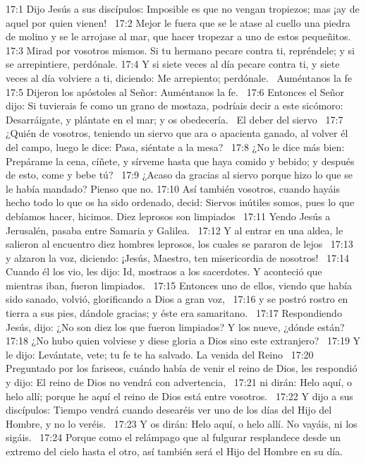 17:1 Dijo Jesús a sus discípulos: Imposible es que no vengan tropiezos; mas ¡ay de aquel por quien vienen!  
17:2 Mejor le fuera que se le atase al cuello una piedra de molino y se le arrojase al mar, que hacer tropezar a uno de estos pequeñitos.  
17:3 Mirad por vosotros mismos. Si tu hermano pecare contra ti, repréndele; y si se arrepintiere, perdónale. 
17:4 Y si siete veces al día pecare contra ti, y siete veces al día volviere a ti, diciendo: Me arrepiento; perdónale.  
Auméntanos la fe  
17:5 Dijeron los apóstoles al Señor: Auméntanos la fe.  
17:6 Entonces el Señor dijo: Si tuvierais fe como un grano de mostaza, podríais decir a este sicómoro: Desarráigate, y plántate en el mar; y os obedecería.  
El deber del siervo  
17:7 ¿Quién de vosotros, teniendo un siervo que ara o apacienta ganado, al volver él del campo, luego le dice: Pasa, siéntate a la mesa?  
17:8 ¿No le dice más bien: Prepárame la cena, cíñete, y sírveme hasta que haya comido y bebido; y después de esto, come y bebe tú?  
17:9 ¿Acaso da gracias al siervo porque hizo lo que se le había mandado? Pienso que no. 
17:10 Así también vosotros, cuando hayáis hecho todo lo que os ha sido ordenado, decid: Siervos inútiles somos, pues lo que debíamos hacer, hicimos. 
Diez leprosos son limpiados  
17:11 Yendo Jesús a Jerusalén, pasaba entre Samaria y Galilea.  
17:12 Y al entrar en una aldea, le salieron al encuentro diez hombres leprosos, los cuales se pararon de lejos  
17:13 y alzaron la voz, diciendo: ¡Jesús, Maestro, ten misericordia de nosotros!  
17:14 Cuando él los vio, les dijo: Id, mostraos a los sacerdotes. Y aconteció que mientras iban, fueron limpiados.  
17:15 Entonces uno de ellos, viendo que había sido sanado, volvió, glorificando a Dios a gran voz,  
17:16 y se postró rostro en tierra a sus pies, dándole gracias; y éste era samaritano.  
17:17 Respondiendo Jesús, dijo: ¿No son diez los que fueron limpiados? Y los nueve, ¿dónde están?  
17:18 ¿No hubo quien volviese y diese gloria a Dios sino este extranjero?  
17:19 Y le dijo: Levántate, vete; tu fe te ha salvado. 
La venida del Reino   
17:20 Preguntado por los fariseos, cuándo había de venir el reino de Dios, les respondió y dijo: El reino de Dios no vendrá con advertencia,  
17:21 ni dirán: Helo aquí, o helo allí; porque he aquí el reino de Dios está entre vosotros.  
17:22 Y dijo a sus discípulos: Tiempo vendrá cuando desearéis ver uno de los días del Hijo del Hombre, y no lo veréis.  
17:23 Y os dirán: Helo aquí, o helo allí. No vayáis, ni los sigáis.  
17:24 Porque como el relámpago que al fulgurar resplandece desde un extremo del cielo hasta el otro, así también será el Hijo del Hombre en su día.  
